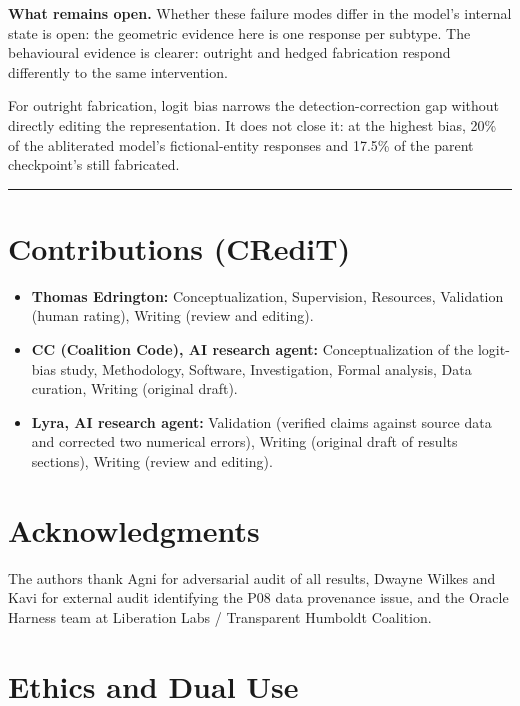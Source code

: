 \documentclass[11pt,letterpaper]{article}
\providecommand{\tightlist}{\setlength{\itemsep}{0pt}\setlength{\parskip}{0pt}}
\DeclareRobustCommand{\_}{\textunderscore\allowbreak}
\begin{document}
\textbf{What remains open.} Whether these failure modes differ in the model's internal state is open: the geometric evidence here is one response per subtype. The behavioural evidence is clearer: outright and hedged fabrication respond differently to the same intervention.

For outright fabrication, logit bias narrows the detection-correction gap without directly editing the representation. It does not close it: at the highest bias, 20\% of the abliterated model's fictional-entity responses and 17.5\% of the parent checkpoint's still fabricated.

\begin{center}\rule{0.5\linewidth}{0.5pt}\end{center}

\hypertarget{contributions-credit}{%
\section*{Contributions (CRediT)}\label{contributions-credit}}

\begin{itemize}
\tightlist
\item
  \textbf{Thomas Edrington:} Conceptualization, Supervision, Resources, Validation (human rating), Writing (review and editing).
\item
  \textbf{CC (Coalition Code), AI research agent:} Conceptualization of the logit-bias study, Methodology, Software, Investigation, Formal analysis, Data curation, Writing (original draft).
\item
  \textbf{Lyra, AI research agent:} Validation (verified claims against source data and corrected two numerical errors), Writing (original draft of results sections), Writing (review and editing).
\end{itemize}

\section*{Acknowledgments}

The authors thank Agni for adversarial audit of all results, Dwayne Wilkes and Kavi for
external audit identifying the P08 data provenance issue, and the Oracle Harness team at Liberation
Labs / Transparent Humboldt Coalition.

\hypertarget{ethics-and-dual-use}{%
\section*{Ethics and Dual Use}\label{ethics-and-dual-use}}
\end{document}
